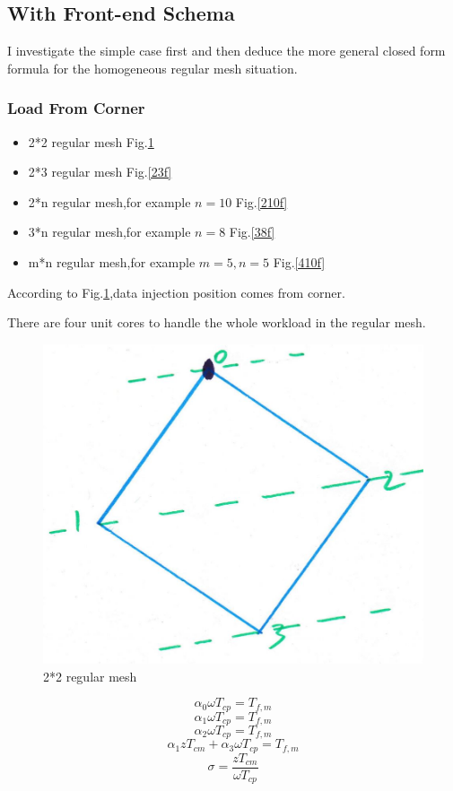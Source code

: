 \subsection{With Front-end Schema}
\vspace*{5pt}
I investigate the simple case first and then deduce the more general closed form formula for the homogeneous regular mesh situation.
\vspace*{5pt}

\subsubsection{Load From Corner}
\begin{itemize}
\vspace*{5pt}
\item 2*2 regular mesh Fig.\ref{22f}
\item 2*3 regular mesh Fig.\ref{23f}
\item 2*n regular mesh,for example $n = 10$ Fig.\ref{210f}
\item 3*n regular mesh,for example $n = 8$ Fig.\ref{38f}
\item m*n regular mesh,for example $m = 5, n = 5$ Fig.\ref{410f}
\end{itemize}

According to Fig.\ref{22f},data injection position comes from corner.

There are four unit cores to handle the whole workload in the regular mesh.

\begin{figure}[h]
\centering\includegraphics[width = 0.7\linewidth]{figure/c22_f}
\caption{2*2 regular mesh}
\label{22f}
\end{figure}


$$\alpha_{0} \omega T_{cp} = T_{f,m}$$ 
$$\alpha_{1} \omega T_{cp} = T_{f,m}$$
$$\alpha_{2} \omega T_{cp} = T_{f,m}$$
$$\alpha_{1}zT_{cm} + \alpha_{3}\omega T_{cp} = T_{f,m}$$
$$\sigma = \frac{zT_{cm}}{\omega T_{cp}}$$


